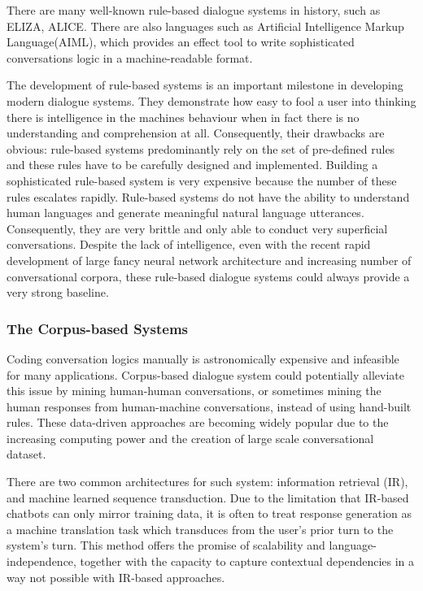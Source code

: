 \documentclass[bsc,frontabs,twoside,singlespacing,parskip,deptreport]{infthesis}     %
\begin{document}
There are many well-known rule-based dialogue systems in history, such as ELIZA\cite{weizenbaum1966eliza}, ALICE\cite{wallace1995artificial}. There are also languages such as Artificial Intelligence Markup Language(AIML), which provides an effect tool to write sophisticated conversations logic in a machine-readable format\cite{wallace1995artificial}.

The development of rule-based systems is an important milestone in developing modern dialogue systems. They demonstrate how easy to fool a user into thinking there is intelligence in the machines behaviour when in fact there is no understanding and comprehension at all. Consequently, their drawbacks are obvious: rule-based systems predominantly rely on the set of pre-defined rules and these rules have to be carefully designed and implemented. Building a sophisticated rule-based system is very expensive because the number of these rules escalates rapidly. Rule-based systems do not have the ability to understand human languages and generate meaningful natural language utterances\cite{jiweilithesis}. Consequently, they are very brittle and only able to conduct very superficial conversations. Despite the lack of intelligence, even with the recent rapid development of large fancy neural network architecture and increasing number of conversational corpora, these rule-based dialogue systems could always provide a very strong baseline.

\subsubsection*{The Corpus-based Systems}

Coding conversation logics manually is astronomically expensive and infeasible for many applications. Corpus-based dialogue system could potentially alleviate this issue by mining human-human conversations, or sometimes mining the human responses from human-machine conversations, instead of using hand-built rules. These data-driven approaches are becoming widely popular due to the increasing computing power and the creation of large scale conversational dataset. 

There are two common architectures for such system: information retrieval (IR), and machine learned sequence transduction. Due to the limitation that IR-based chatbots can only mirror training data, it is often to treat response generation as a machine translation task which transduces from the user’s prior turn to the system’s turn. This method offers the promise of scalability and language-independence, together with the capacity to capture contextual dependencies in a way not possible with IR-based approaches.
\end{document}
